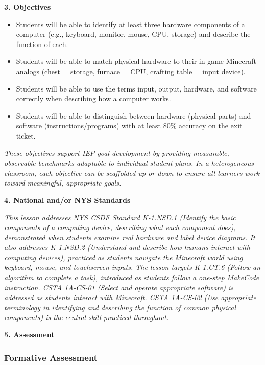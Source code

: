\documentclass[11pt,letterpaper]{article}
\begin{document}
\textbf{3. Objectives}

\begin{itemize}
  \item Students will be able to identify at least three hardware components of a computer (e.g., keyboard, monitor, mouse, CPU, storage) and describe the function of each.

  \item Students will be able to match physical hardware to their in-game Minecraft analogs (chest = storage, furnace = CPU, crafting table = input device).

  \item Students will be able to use the terms input, output, hardware, and software correctly when describing how a computer works.

  \item Students will be able to distinguish between hardware (physical parts) and software (instructions/programs) with at least 80\% accuracy on the exit ticket.
\end{itemize}

\textit{These objectives support IEP goal development by providing measurable, observable benchmarks adaptable to individual student plans. In a heterogeneous classroom, each objective can be scaffolded up or down to ensure all learners work toward meaningful, appropriate goals.}

\newpage
\textbf{4. National and/or NYS Standards}

\textit{This lesson addresses NYS CSDF Standard K-1.NSD.1 (Identify the basic components of a computing device, describing what each component does), demonstrated when students examine real hardware and label device diagrams. It also addresses K-1.NSD.2 (Understand and describe how humans interact with computing devices), practiced as students navigate the Minecraft world using keyboard, mouse, and touchscreen inputs. The lesson targets K-1.CT.6 (Follow an algorithm to complete a task), introduced as students follow a one-step MakeCode instruction. CSTA 1A-CS-01 (Select and operate appropriate software) is addressed as students interact with Minecraft. CSTA 1A-CS-02 (Use appropriate terminology in identifying and describing the function of common physical components) is the central skill practiced throughout.}

\textbf{5. Assessment}

\subsubsection{Formative Assessment}
\end{document}
